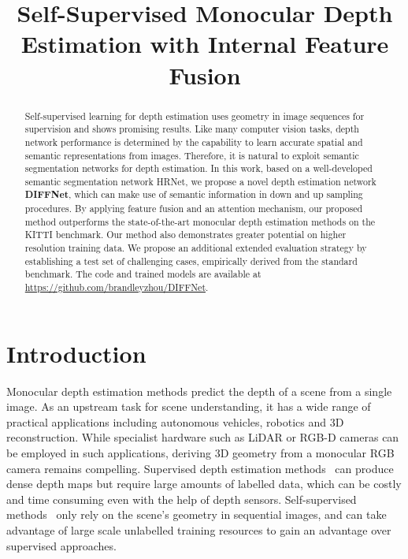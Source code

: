 \documentclass{bmvc2k}
\title{Self-Supervised Monocular Depth Estimation with Internal Feature Fusion}
\begin{document}
\maketitle
\begin{abstract}
 Self-supervised learning for depth estimation uses geometry in image sequences for supervision and shows promising results. Like many computer vision tasks, depth network performance is determined by the capability to learn accurate spatial and semantic representations from images. Therefore, it is natural to exploit semantic segmentation networks for depth estimation. 
In this work, based on a well-developed semantic segmentation network HRNet, we propose a novel depth estimation network \textbf{DIFFNet}, which can make use of semantic information in down and up sampling procedures. 
 By applying feature fusion and an attention mechanism, our proposed method outperforms the state-of-the-art monocular depth estimation methods on the KITTI benchmark. Our method also demonstrates greater potential on higher resolution training data. We propose an additional extended evaluation strategy by establishing a test set of challenging cases, empirically derived from the standard benchmark. The code and trained models are available at \url{https://github.com/brandleyzhou/DIFFNet}. 
\end{abstract}
\section{Introduction}
\label{sec:intro}
Monocular depth estimation methods predict the depth of a scene from a single image. As an upstream task for scene understanding, it has a wide range of practical applications including autonomous vehicles, robotics and 3D reconstruction. While specialist hardware such as LiDAR or RGB-D cameras can be employed in such applications, deriving 3D geometry from a monocular RGB camera remains compelling. Supervised depth estimation methods~\cite{Eigen2014,Miangoleh2021Boosting,chen2021s,yang2019inferring,GargDualPixelsICCV2019,Ranftl2020} can produce dense depth maps but require large amounts of labelled data, which can be costly and time consuming even with the help of depth sensors. Self-supervised methods~\cite{zhou_sfmlearner, monodepth2, chen2019towards, zhou2020constant,klingner2020self} only rely on the scene's geometry in sequential images, and can take advantage of large scale unlabelled training resources to gain an advantage over supervised approaches.
\end{document}
